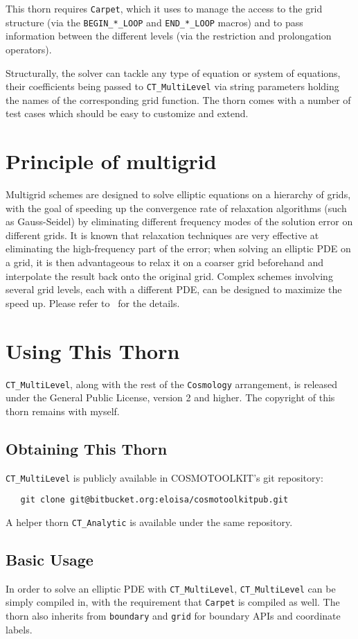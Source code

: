 This thorn requires \texttt{Carpet}, which it uses to manage the 
access to the grid structure (via the \texttt{BEGIN\_*\_LOOP} and 
\texttt{END\_*\_LOOP} macros) and to pass information between the 
different levels (via the restriction and prolongation operators).

Structurally, the solver can tackle any type of equation or system
of equations, their coefficients being passed to \texttt{CT\_MultiLevel} 
via string parameters holding the names of the corresponding grid 
function. The thorn comes with a number of test cases which should 
be easy to customize and extend.

\section{Principle of multigrid}
Multigrid schemes are designed to solve elliptic equations on a 
hierarchy of grids, with the goal of speeding up the convergence 
rate of relaxation algorithms (such as Gauss-Seidel) by eliminating
different frequency modes of the solution error on different grids.
It is known that relaxation techniques are very effective at 
eliminating the high-frequency part of the error; when solving an 
elliptic PDE on a grid, it is then advantageous to relax it on a 
coarser grid beforehand and interpolate the result back onto the
original grid. Complex schemes involving several grid levels, each
with a different PDE, can be designed to maximize the speed up.
Please refer to~\cite{Briggs:2000fk} for the details.

\section{Using This Thorn}
\texttt{CT\_MultiLevel}, along with the rest of the \texttt{Cosmology}
arrangement, is released under the General Public License, version 2
and higher. The copyright of this thorn remains with myself.

\subsection{Obtaining This Thorn}
\texttt{CT\_MultiLevel} is publicly available in COSMOTOOLKIT's git 
repository:
\begin{verbatim}
   git clone git@bitbucket.org:eloisa/cosmotoolkitpub.git 
\end{verbatim}
A helper thorn \texttt{CT\_Analytic} is available under the same repository.

\subsection{Basic Usage}
In order to solve an elliptic PDE with \texttt{CT\_MultiLevel},
\texttt{CT\_MultiLevel} can be simply compiled in, with the 
requirement that \texttt{Carpet} is compiled as well. The thorn 
also inherits from \texttt{boundary} and \texttt{grid} for boundary 
APIs and coordinate labels.

